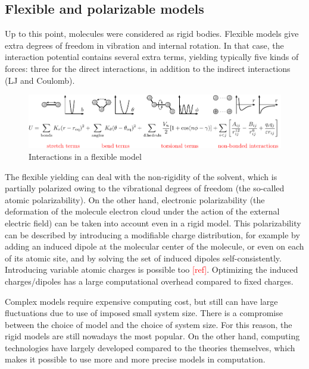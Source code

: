 \subsection{Flexible and polarizable models}

Up to this point, molecules were considered as rigid bodies. Flexible
models give extra degrees of freedom in vibration and internal rotation.
In that case, the interaction potential contains several extra terms,
yielding typically five kinds of forces: three for the direct interactions,
in addition to the indirect interactions (LJ and Coulomb).

\begin{figure}[h]
\begin{centering}
\includegraphics[width=1\columnwidth]{_figure/flexible}
\par\end{centering}
\caption{Interactions in a flexible model}
\end{figure}

The flexible yielding can deal with the non-rigidity of the solvent,
which is partially polarized owing to the vibrational degrees of freedom
(the so-called atomic polarizability). On the other hand, electronic
polarizability (the deformation of the molecule electron cloud under
the action of the external electric field) can be taken into account
even in a rigid model. This polarizability can be described by introducing
a modifiable charge distribution, for example by adding an induced
dipole at the molecular center of the molecule, or even on each of
its atomic site, and by solving the set of induced dipoles self-consistently.
Introducing variable atomic charges is possible too \textcolor{red}{{[}ref{]}}.
Optimizing the induced charges/dipoles has a large computational overhead
compared to fixed charges.

Complex models require expensive computing cost, but still can have
large fluctuations due to use of imposed small system size. There
is a compromise between the choice of model and the choice of system
size. For this reason, the rigid models are still nowadays the most
popular. On the other hand, computing technologies have largely developed
compared to the theories themselves, which makes it possible to use
more and more precise models in computation. 

